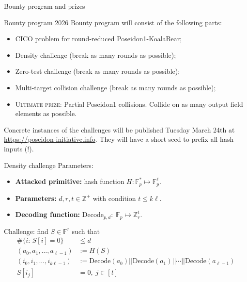\documentclass[t,8pt]{beamer}
\begin{document}
\begin{frame}[c]{}
\begin{center}
\Large{Bounty program and prizes}
\end{center}
\end{frame}


\begin{frame}{Bounty program 2026}
   Bounty program will consist of the following parts:
    \begin{itemize}
        \item CICO problem for round-reduced Poseidon1-KoalaBear;
        \item Density challenge (break as many rounds as possible);
        \item Zero-test challenge (break as many rounds as possible);
        \item Multi-target collision challenge (break as many rounds as possible);
        \item \textsc{Ultimate prize}: Partial Poseidon1 collisions.
        Collide on as many output field elements as possible.
    \end{itemize}

    Concrete instances of the challenges will be published Tuesday March 24th at
    \url{https://poseidon-initiative.info}. They will
    have a short seed to prefix all hash inputs (!).
\end{frame}


\begin{frame}{Density challenge}
    Parameters:
\begin{itemize}
    \item
\textbf{Attacked primitive:} hash function $H:\mathbb{F}_p^{*}\mapsto \mathbb{F}_p^{\ell}$.
\item
\textbf{Parameters:} $d,r,t\in\mathbb{Z}^{+}$ with condition $t\leq k\ell$.

\item \textbf{Decoding function:} $\mathrm{Decode}_{p,d}:\;\mathbb{F}_p\mapsto \mathbb{Z}_r^t$.
\end{itemize}
Challenge: find $S\in\mathbb{F}^r$ such that
\begin{align}
\#\{i:\,S[i]=0\}&\leq d\\
(a_0,a_1,\ldots,a_{\ell-1}) &:=H(S) \\
(i_0,i_1,\ldots,i_{k\ell-1})&:=\mathrm{Decode}(a_0)||\mathrm{Decode}(a_1)||\cdots||\mathrm{Decode}(a_{\ell-1})\\
S[i_j]&=0,\; j\in[t]
\end{align}
\end{frame}
\end{document}
